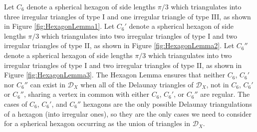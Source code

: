 \documentclass[10pt]{article}
\numberwithin{Subcase}{Case}
\begin{document}
Let $C_6$ denote a spherical hexagon of side lengths $\pi/3$ which triangulates into three irregular triangles of type I and one irregular triangle of type III, as shown in Figure \ref{fig:HexagonLemma1}. Let $C_6'$ denote a spherical hexagon of side lengths $\pi/3$ which triangulates into two irregular triangles of type I and two irregular triangles of type II, as shown in Figure \ref{fig:HexagonLemma2}. Let $C_6''$ denote a spherical hexagon of side lengths $\pi/3$ which triangulates into two irregular triangles of type I and two irregular triangles of type II, as shown in Figure \ref{fig:HexagonLemma3}. The Hexagon Lemma ensures that neither $C_6$, $C_6'$ nor $C_6''$ can exist in $\mathcal{D}_{X}$ when all of the Delaunay triangles of $\mathcal{D}_{X}$, not in $C_6$, $C_6'$ or $C_6''$, sharing a vertex in common with either $C_6$, $C_6'$, or $C_6''$ are regular. The cases of $C_6$, $C_6'$, and $C_6''$ hexagons are the only possible Delaunay triangulations of a hexagon (into irregular ones), so they are the only cases we need to consider for a spherical hexagon occurring as the union of triangles in $\mathcal{D}_{X}$.
\end{document}
